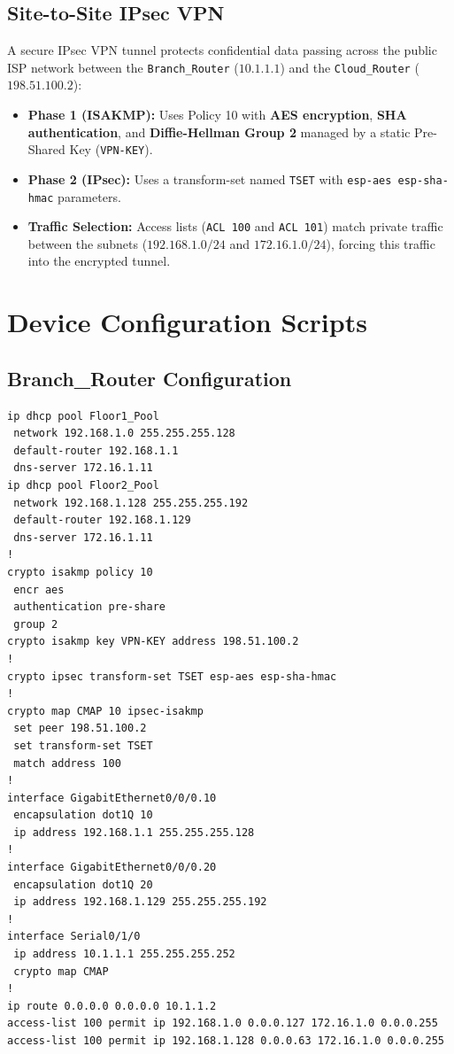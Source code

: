 \documentclass[12pt,a4paper]{article}
\begin{document}
\subsection{Site-to-Site IPsec VPN}
A secure IPsec VPN tunnel protects confidential data passing across the public ISP network between the \texttt{Branch\_Router} ($10.1.1.1$) and the \texttt{Cloud\_Router} ($198.51.100.2$):
\begin{itemize}
    \item \textbf{Phase 1 (ISAKMP):} Uses Policy 10 with \textbf{AES encryption}, \textbf{SHA authentication}, and \textbf{Diffie-Hellman Group 2} managed by a static Pre-Shared Key (\texttt{VPN-KEY}).
    \item \textbf{Phase 2 (IPsec):} Uses a transform-set named \texttt{TSET} with \texttt{esp-aes esp-sha-hmac} parameters.
    \item \textbf{Traffic Selection:} Access lists (\texttt{ACL 100} and \texttt{ACL 101}) match private traffic between the subnets ($192.168.1.0/24$ and $172.16.1.0/24$), forcing this traffic into the encrypted tunnel.
\end{itemize}

\newpage
\section{Device Configuration Scripts}

\subsection{Branch\_Router Configuration}
\begin{lstlisting}
ip dhcp pool Floor1_Pool
 network 192.168.1.0 255.255.255.128
 default-router 192.168.1.1
 dns-server 172.16.1.11
ip dhcp pool Floor2_Pool
 network 192.168.1.128 255.255.255.192
 default-router 192.168.1.129
 dns-server 172.16.1.11
!
crypto isakmp policy 10
 encr aes
 authentication pre-share
 group 2
crypto isakmp key VPN-KEY address 198.51.100.2
!
crypto ipsec transform-set TSET esp-aes esp-sha-hmac
!
crypto map CMAP 10 ipsec-isakmp 
 set peer 198.51.100.2
 set transform-set TSET 
 match address 100
!
interface GigabitEthernet0/0/0.10
 encapsulation dot1Q 10
 ip address 192.168.1.1 255.255.255.128
!
interface GigabitEthernet0/0/0.20
 encapsulation dot1Q 20
 ip address 192.168.1.129 255.255.255.192
!
interface Serial0/1/0
 ip address 10.1.1.1 255.255.255.252
 crypto map CMAP
!
ip route 0.0.0.0 0.0.0.0 10.1.1.2
access-list 100 permit ip 192.168.1.0 0.0.0.127 172.16.1.0 0.0.0.255
access-list 100 permit ip 192.168.1.128 0.0.0.63 172.16.1.0 0.0.0.255
\end{lstlisting}
\end{document}
